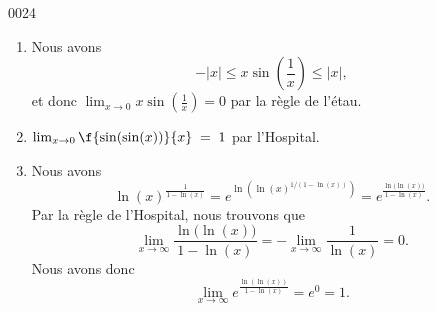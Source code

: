 
\begin{corrige}{0024}

\begin{enumerate}
\item 
Nous avons
\begin{equation}
	-| x |\leq x\sin(\frac{1}{ x })\leq | x |,
\end{equation}
et donc $\lim_{x\to 0}x\sin(\frac{1}{ x })=0$ par la règle de l'étau.

\item
  $\lim_{x\rightarrow 0} \f{\sin(\sin(x))}{x}  \; = \; 1$ par l'Hospital.

\item

Nous avons
\begin{equation}
	\ln(x)^{\frac{1}{ 1-\ln(x) }}= e^{\ln(  \ln(x)^{1/(1-\ln(x))} )}= e^{\frac{ \ln\big( \ln(x) \big) }{ 1-\ln(x) }}.
\end{equation}
Par la règle de l'Hospital, nous trouvons que
\begin{equation}
	\lim_{x\to\infty}\frac{ \ln\big( \ln(x) \big) }{ 1-\ln(x) }=-\lim_{x\to\infty}\frac{1}{ \ln(x) }=0.
\end{equation}
Nous avons donc
\begin{equation}
	\lim_{x\to\infty} e^{\frac{ \ln( \ln(x)) }{ 1-\ln(x) }}=e^0=1.
\end{equation}

\end{enumerate}

\end{corrige}
